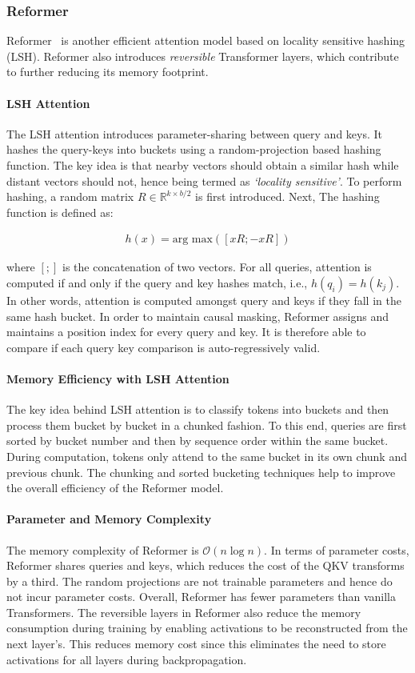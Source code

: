 \subsubsection{Reformer}
Reformer~\citep{kitaev2020reformer} is another efficient attention model based on locality sensitive hashing (LSH). Reformer also introduces \emph{reversible} Transformer layers, which contribute to further reducing its memory footprint.

\paragraph{LSH Attention} The LSH attention introduces parameter-sharing between query and keys. It hashes the query-keys into buckets using a random-projection based hashing function. The key idea is that nearby vectors should obtain a similar hash while distant vectors should not, hence being termed as \textit{`locality sensitive'}. To perform hashing, a random matrix $R \in \mathbb{R}^{k \times b/2}$ is first introduced. Next, The hashing function is defined as:

\begin{align}
h(x) = \text{arg max}([xR;-xR])    
\end{align}

where $[;]$ is the concatenation of two vectors. For all queries, attention is computed if and only if the query and key hashes match, i.e., $h(q_i)=h(k_j)$. In other words, attention is computed amongst query and keys if they fall in the same hash bucket. In order to maintain causal masking, Reformer assigns and maintains a position index for every query and key. It is therefore able to compare if each query key comparison is auto-regressively valid. 
\paragraph{Memory Efficiency with LSH Attention} The key idea behind LSH attention is to classify tokens into buckets and then process them bucket by bucket in a chunked fashion. To this end, queries are first sorted by bucket number and then by sequence order within the same bucket. During computation, tokens only attend to the same bucket in its own chunk and previous chunk. The chunking and sorted bucketing techniques help to improve the overall efficiency of the Reformer model.

\paragraph{Parameter and Memory Complexity} The memory complexity of Reformer is $\mathcal{O}(n \log n)$. In terms of parameter costs, Reformer shares queries and keys, which reduces the cost of the QKV transforms by a third. The random projections are not trainable parameters and hence do not incur parameter costs. Overall, Reformer has fewer parameters than vanilla Transformers. The reversible layers in Reformer also reduce the memory consumption during training by enabling activations to be reconstructed from the next layer's. This reduces memory cost since this eliminates the need to store activations for all layers during backpropagation.

